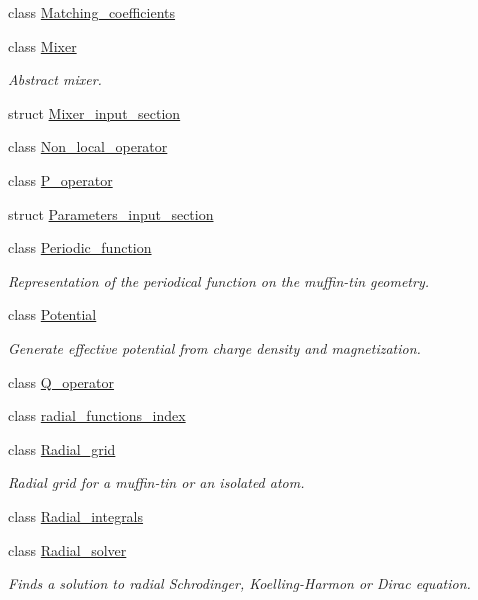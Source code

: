 \begin{DoxyCompactItemize}
\item 
class \hyperlink{classsirius_1_1_matching__coefficients}{Matching\+\_\+coefficients}
\item 
class \hyperlink{classsirius_1_1_mixer}{Mixer}
\begin{DoxyCompactList}\small\item\em Abstract mixer. \end{DoxyCompactList}\item 
struct \hyperlink{structsirius_1_1_mixer__input__section}{Mixer\+\_\+input\+\_\+section}
\item 
class \hyperlink{classsirius_1_1_non__local__operator}{Non\+\_\+local\+\_\+operator}
\item 
class \hyperlink{classsirius_1_1_p__operator}{P\+\_\+operator}
\item 
struct \hyperlink{structsirius_1_1_parameters__input__section}{Parameters\+\_\+input\+\_\+section}
\item 
class \hyperlink{classsirius_1_1_periodic__function}{Periodic\+\_\+function}
\begin{DoxyCompactList}\small\item\em Representation of the periodical function on the muffin-\/tin geometry. \end{DoxyCompactList}\item 
class \hyperlink{classsirius_1_1_potential}{Potential}
\begin{DoxyCompactList}\small\item\em Generate effective potential from charge density and magnetization. \end{DoxyCompactList}\item 
class \hyperlink{classsirius_1_1_q__operator}{Q\+\_\+operator}
\item 
class \hyperlink{classsirius_1_1radial__functions__index}{radial\+\_\+functions\+\_\+index}
\item 
class \hyperlink{classsirius_1_1_radial__grid}{Radial\+\_\+grid}
\begin{DoxyCompactList}\small\item\em Radial grid for a muffin-\/tin or an isolated atom. \end{DoxyCompactList}\item 
class \hyperlink{classsirius_1_1_radial__integrals}{Radial\+\_\+integrals}
\item 
class \hyperlink{classsirius_1_1_radial__solver}{Radial\+\_\+solver}
\begin{DoxyCompactList}\small\item\em Finds a solution to radial Schrodinger, Koelling-\/\+Harmon or Dirac equation. \end{DoxyCompactList}\item 

\end{DoxyCompactItemize}
